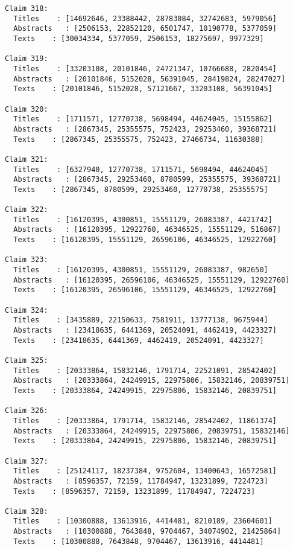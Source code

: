 \documentclass[11pt]{article}
\begin{document}
\begin{Verbatim}[commandchars=\\\{\}]
Claim 318:
  Titles    : [14692646, 23388442, 28783084, 32742683, 5979056]
  Abstracts   : [2506153, 22852120, 6501747, 10190778, 5377059]
  Texts    : [30034334, 5377059, 2506153, 18275697, 9977329]

Claim 319:
  Titles    : [33203108, 20101846, 24721347, 10766688, 2820454]
  Abstracts   : [20101846, 5152028, 56391045, 28419824, 28247027]
  Texts    : [20101846, 5152028, 57121667, 33203108, 56391045]

Claim 320:
  Titles    : [1711571, 12770738, 5698494, 44624045, 15155862]
  Abstracts   : [2867345, 25355575, 752423, 29253460, 39368721]
  Texts    : [2867345, 25355575, 752423, 27466734, 11630388]

Claim 321:
  Titles    : [6327940, 12770738, 1711571, 5698494, 44624045]
  Abstracts   : [2867345, 29253460, 8780599, 25355575, 39368721]
  Texts    : [2867345, 8780599, 29253460, 12770738, 25355575]

Claim 322:
  Titles    : [16120395, 4300851, 15551129, 26083387, 4421742]
  Abstracts   : [16120395, 12922760, 46346525, 15551129, 516867]
  Texts    : [16120395, 15551129, 26596106, 46346525, 12922760]

Claim 323:
  Titles    : [16120395, 4300851, 15551129, 26083387, 982650]
  Abstracts   : [16120395, 26596106, 46346525, 15551129, 12922760]
  Texts    : [16120395, 26596106, 15551129, 46346525, 12922760]

Claim 324:
  Titles    : [3435889, 22150633, 7581911, 13777138, 9675944]
  Abstracts   : [23418635, 6441369, 20524091, 4462419, 4423327]
  Texts    : [23418635, 6441369, 4462419, 20524091, 4423327]

Claim 325:
  Titles    : [20333864, 15832146, 1791714, 22521091, 28542402]
  Abstracts   : [20333864, 24249915, 22975806, 15832146, 20839751]
  Texts    : [20333864, 24249915, 22975806, 15832146, 20839751]

Claim 326:
  Titles    : [20333864, 1791714, 15832146, 28542402, 11861374]
  Abstracts   : [20333864, 24249915, 22975806, 20839751, 15832146]
  Texts    : [20333864, 24249915, 22975806, 15832146, 20839751]

Claim 327:
  Titles    : [25124117, 18237384, 9752604, 13400643, 16572581]
  Abstracts   : [8596357, 72159, 11784947, 13231899, 7224723]
  Texts    : [8596357, 72159, 13231899, 11784947, 7224723]

Claim 328:
  Titles    : [10300888, 13613916, 4414481, 8210189, 23604601]
  Abstracts   : [10300888, 7643848, 9704467, 34074902, 21425864]
  Texts    : [10300888, 7643848, 9704467, 13613916, 4414481]


\end{Verbatim}
\end{document}

